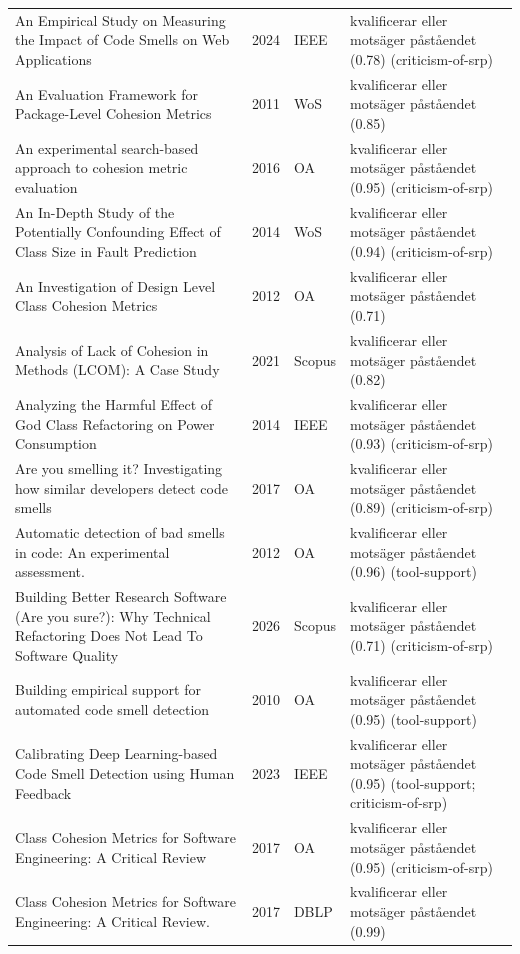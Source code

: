 \begin{longtable}{@{}%
  >{\raggedright\arraybackslash}p{}c%
  >{\raggedright\arraybackslash}p{}%
  >{\raggedright\arraybackslash}p{}@{}}
An Empirical Study on Measuring the Impact of Code Smells on Web Applications & 2024 & IEEE & kvalificerar eller motsäger påståendet (0.78) (criticism-of-srp) \\
An Evaluation Framework for Package-Level Cohesion Metrics & 2011 & WoS & kvalificerar eller motsäger påståendet (0.85) \\
An experimental search-based approach to cohesion metric evaluation & 2016 & OA & kvalificerar eller motsäger påståendet (0.95) (criticism-of-srp) \\
An In-Depth Study of the Potentially Confounding Effect of Class Size in Fault Prediction & 2014 & WoS & kvalificerar eller motsäger påståendet (0.94) (criticism-of-srp) \\
An Investigation of Design Level Class Cohesion Metrics & 2012 & OA & kvalificerar eller motsäger påståendet (0.71) \\
Analysis of Lack of Cohesion in Methods (LCOM): A Case Study & 2021 & Scopus & kvalificerar eller motsäger påståendet (0.82) \\
Analyzing the Harmful Effect of God Class Refactoring on Power Consumption & 2014 & IEEE & kvalificerar eller motsäger påståendet (0.93) (criticism-of-srp) \\
Are you smelling it? Investigating how similar developers detect code smells & 2017 & OA & kvalificerar eller motsäger påståendet (0.89) (criticism-of-srp) \\
Automatic detection of bad smells in code: An experimental assessment. & 2012 & OA & kvalificerar eller motsäger påståendet (0.96) (tool-support) \\
Building Better Research Software (Are you sure?): Why Technical Refactoring Does Not Lead To Software Quality & 2026 & Scopus & kvalificerar eller motsäger påståendet (0.71) (criticism-of-srp) \\
Building empirical support for automated code smell detection & 2010 & OA & kvalificerar eller motsäger påståendet (0.95) (tool-support) \\
Calibrating Deep Learning-based Code Smell Detection using Human Feedback & 2023 & IEEE & kvalificerar eller motsäger påståendet (0.95) (tool-support; criticism-of-srp) \\
Class Cohesion Metrics for Software Engineering: A Critical Review & 2017 & OA & kvalificerar eller motsäger påståendet (0.95) (criticism-of-srp) \\
Class Cohesion Metrics for Software Engineering: A Critical Review. & 2017 & DBLP & kvalificerar eller motsäger påståendet (0.99) \\

\end{longtable}
